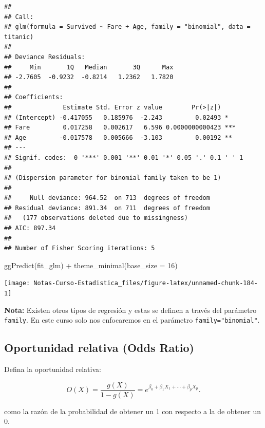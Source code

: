 \documentclass[
  12pt,
]{book}
\newenvironment{Shaded}{\begin{snugshade}}{\end{snugshade}}
\newcommand{\AttributeTok}[1]{\textcolor[rgb]{0.77,0.63,0.00}{#1}}
\newcommand{\DecValTok}[1]{\textcolor[rgb]{0.00,0.00,0.81}{#1}}
\newcommand{\FunctionTok}[1]{\textcolor[rgb]{0.00,0.00,0.00}{#1}}
\newcommand{\NormalTok}[1]{#1}
\newcommand{\SpecialCharTok}[1]{\textcolor[rgb]{0.00,0.00,0.00}{#1}}
\begin{document}
\begin{verbatim}
## 
## Call:
## glm(formula = Survived ~ Fare + Age, family = "binomial", data = titanic)
## 
## Deviance Residuals: 
##     Min       1Q   Median       3Q      Max  
## -2.7605  -0.9232  -0.8214   1.2362   1.7820  
## 
## Coefficients:
##              Estimate Std. Error z value        Pr(>|z|)    
## (Intercept) -0.417055   0.185976  -2.243         0.02493 *  
## Fare         0.017258   0.002617   6.596 0.0000000000423 ***
## Age         -0.017578   0.005666  -3.103         0.00192 ** 
## ---
## Signif. codes:  0 '***' 0.001 '**' 0.01 '*' 0.05 '.' 0.1 ' ' 1
## 
## (Dispersion parameter for binomial family taken to be 1)
## 
##     Null deviance: 964.52  on 713  degrees of freedom
## Residual deviance: 891.34  on 711  degrees of freedom
##   (177 observations deleted due to missingness)
## AIC: 897.34
## 
## Number of Fisher Scoring iterations: 5
\end{verbatim}

\begin{Shaded}
\begin{Highlighting}[]
\FunctionTok{ggPredict}\NormalTok{(fit\_glm) }\SpecialCharTok{+} \FunctionTok{theme\_minimal}\NormalTok{(}\AttributeTok{base\_size =} \DecValTok{16}\NormalTok{)}
\end{Highlighting}
\end{Shaded}

\begin{center}\texttt{[image: Notas-Curso-Estadistica\_files/figure-latex/unnamed-chunk-184-1]} \end{center}

\textbf{Nota:} Existen otros tipos de regresión y estas se definen a
través del parámetro \texttt{family}. En este curso solo nos enfocaremos
en el parámetro \texttt{family="binomial"}.

\hypertarget{oportunidad-relativa-odds-ratio}{%
\subsection{Oportunidad relativa (Odds
Ratio)}\label{oportunidad-relativa-odds-ratio}}

Defina la oportunidad relativa:

\begin{equation*}
O(X) = \frac{g(X)}{1-g(X)} = e^{\beta_{0} +\beta_{1} X_{1} + \cdots + \beta_{p} X_{p}}.
\end{equation*}

como la razón de la probabilidad de obtener un 1 con respecto a la de
obtener un 0.
\end{document}
